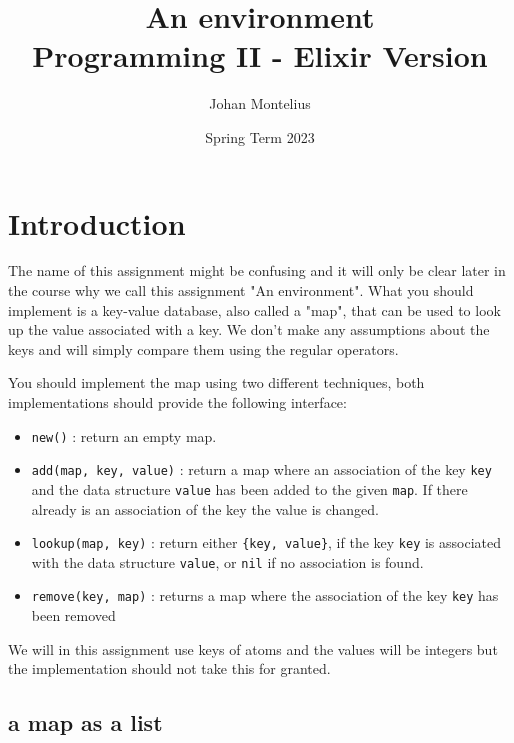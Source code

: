 \documentclass[a4paper,11pt]{article}
\begin{document}
\title{
    \textbf{An environment}\\
    \large{Programming II - Elixir Version}
}
\author{Johan Montelius}
\date{Spring Term 2023}
\maketitle
{}


\section*{Introduction}

The name of this assignment might be confusing and it will only be
clear later in the course why we call this assignment "An
environment". What you should implement is a key-value database, also
called a "map", that can be used to look up the value associated with
a key. We don't make any assumptions about the keys and will simply
compare them using the regular operators.

You should implement the map using two different techniques, both
implementations should provide the following interface:

\begin{itemize}
\item {\tt new()} : return an empty map.

\item {\tt add(map, key, value)} : return a map where an association of
  the key {\tt key} and the data structure {\tt value} has been added to
  the given {\tt map}. If there already is an association of the key
  the value is changed.

\item {\tt lookup(map, key)} : return either {\tt \{key, value\}}, if
  the key {\tt key} is associated with the data structure {\tt value},
  or {\tt nil} if no association is found.

\item {\tt remove(key, map)} : returns a map where the
  association of the key {\tt key} has been removed
\end{itemize}


We will in this assignment use keys of atoms and the values will be
integers but the implementation should not take this for granted.

\subsection*{a map as a list}
\end{document}

